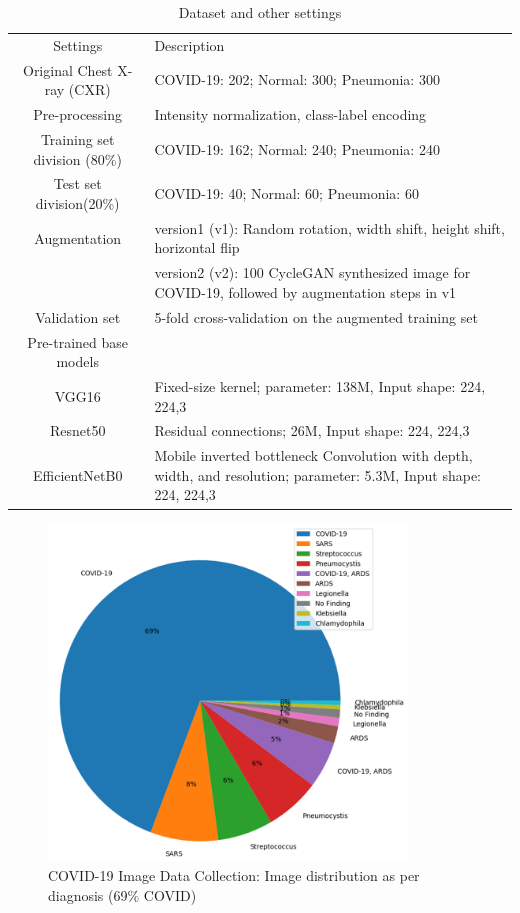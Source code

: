 \begin{table}[h!]{
\centering
\caption{Dataset and other settings }\label{data}
\begin{tabularx}{0.95\textwidth}{c X}
\toprule
Settings & Description\\
\otoprule
Original Chest X-ray (CXR)& COVID-19: 202; Normal: 300; Pneumonia: 300 \\
Pre-processing & Intensity normalization, class-label encoding  \\
Training set division (80\%)& COVID-19: 162; Normal: 240; Pneumonia: 240 \\
Test set division(20\%)&COVID-19: 40; Normal: 60; Pneumonia: 60 \\
Augmentation & version1 (v1): Random rotation, width shift, height shift, horizontal flip\\
 & version2 (v2): 100 CycleGAN  synthesized image for COVID-19, followed by augmentation steps in v1 \\
Validation set & 5-fold cross-validation on the augmented training set\\
Pre-trained base models & \\
VGG16& Fixed-size kernel; parameter: 138M, Input shape:  224, 224,3\\
Resnet50\cite{he2016deep}  &Residual connections;  26M, Input shape:  224, 224,3 \\
EfficientNetB0 \cite{tan2019efficientnet}& Mobile inverted bottleneck Convolution with depth, width, and resolution; parameter: 5.3M, Input shape:  224, 224,3\\

\bottomrule
\end{tabularx}}
\end{table}

 \begin{figure}[h!]
\centering
\includegraphics[width=0.85\textwidth]{images/Finding_PA_Figure_1.png}
   \caption{COVID-19 Image Data Collection: Image distribution as per diagnosis (69\% COVID) }
\label{fig:data_dist}
\end{figure}



